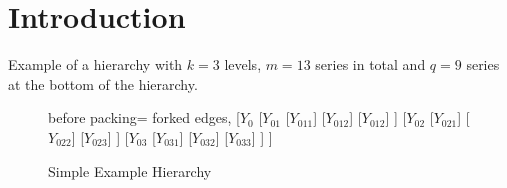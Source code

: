 \documentclass[a4paper,fleqn,11pt]{article}
\begin{document}
%			




\section{Introduction}
\label{sec:model}

Example of a hierarchy with $k = 3$ levels, $m = 13$ series in total and $q = 9$ series at the bottom of the hierarchy.\\

\begin{figure}[H]
	\centering
	\begin{forest}
	before packing={
		forked edges,
	}
		[{$Y_0$}
			 [{$Y_{01}$}
		 		[{$Y_{011}$}]
				[{$Y_{012}$}]
		 		[{$Y_{012}$}]
		 	]
			 [{$Y_{02}$}
		 		[{$Y_{021}$}]
				[{$Y_{022}$}]
		 		[{$Y_{023}$}]
		 	]
			 [{$Y_{03}$}
				[{$Y_{031}$}]
				[{$Y_{032}$}]
				[{$Y_{033}$}]
			]
		]
	\end{forest}
\vspace{0.5cm}
	\caption{Simple Example Hierarchy}
\end{figure}
\end{document}
